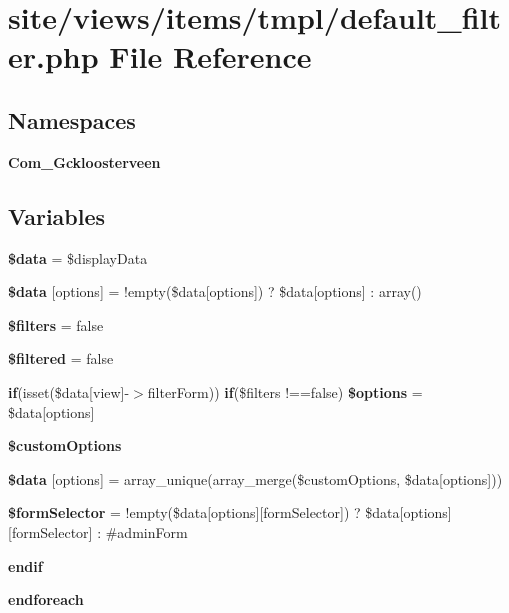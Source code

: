 \section{site/views/items/tmpl/default\+\_\+filter.php File Reference}
\label{items_2tmpl_2default__filter_8php}
\subsection*{Namespaces}
\begin{DoxyCompactItemize}
\item 
 \textbf{ Com\+\_\+\+Gckloosterveen}
\end{DoxyCompactItemize}
\subsection*{Variables}
\begin{DoxyCompactItemize}
\item 
\textbf{ \$data} = \$display\+Data
\item 
\textbf{ \$data} [\textquotesingle{}options\textquotesingle{}] = !empty(\$data[\textquotesingle{}options\textquotesingle{}]) ? \$data[\textquotesingle{}options\textquotesingle{}] \+: array()
\item 
\textbf{ \$filters} = false
\item 
\textbf{ \$filtered} = false
\item 
\textbf{ if}(isset(\$data[\textquotesingle{}view\textquotesingle{}]-\/$>$filter\+Form)) \textbf{ if}(\$filters !==false) \textbf{ \$options} = \$data[\textquotesingle{}options\textquotesingle{}]
\item 
\textbf{ \$custom\+Options}
\item 
\textbf{ \$data} [\textquotesingle{}options\textquotesingle{}] = array\+\_\+unique(array\+\_\+merge(\$custom\+Options, \$data[\textquotesingle{}options\textquotesingle{}]))
\item 
\textbf{ \$form\+Selector} = !empty(\$data[\textquotesingle{}options\textquotesingle{}][\textquotesingle{}form\+Selector\textquotesingle{}]) ? \$data[\textquotesingle{}options\textquotesingle{}][\textquotesingle{}form\+Selector\textquotesingle{}] \+: \textquotesingle{}\#admin\+Form\textquotesingle{}
\item 
\textbf{ endif}
\item 
\textbf{ endforeach}
\end{DoxyCompactItemize}


